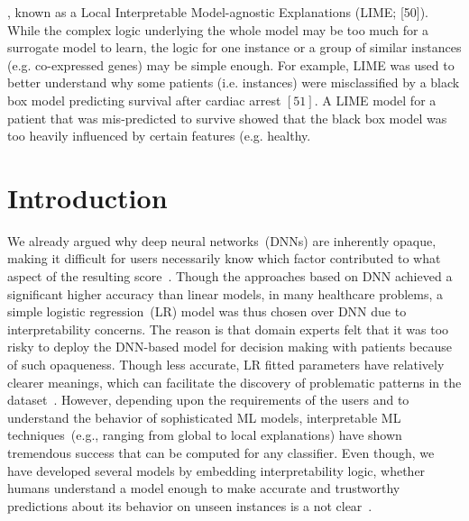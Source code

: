 , known as a Local Interpretable Model-agnostic Explanations (LIME; [50]). 
While the complex logic underlying the whole model may be too much for a surrogate model to learn, the logic for one instance or a group of similar instances (e.g. co-expressed genes) may be simple enough. For example, LIME was used to better understand why some patients (i.e. instances) were misclassified by a black box model predicting survival after cardiac arrest $[51] .$ A LIME model for a patient that was mis-predicted to survive showed that the black box model was too heavily influenced by certain features (e.g. healthy. 

\section{Introduction} \label{chapter_7:intro}
We already argued why deep neural networks~(DNNs) are inherently opaque, making it difficult for users necessarily know which factor contributed to what aspect of the resulting score~\cite{ribeiro2018anchors}. Though the approaches based on DNN achieved a significant higher accuracy than linear models, in many healthcare problems, a simple logistic regression~(LR) model was thus chosen over DNN due to interpretability concerns. The reason is that domain experts felt that it was too risky to deploy the DNN-based model for decision making with patients because of such opaqueness. Though less accurate, LR fitted parameters have relatively clearer meanings, which can facilitate the discovery of problematic patterns in the dataset~\cite{ming2018rulematrix}. 
However, depending upon the requirements of the users and to understand the behavior of sophisticated ML models, interpretable ML techniques~(e.g., ranging from global to local explanations) have shown tremendous success that can be computed for any classifier. Even though, we have developed several models by embedding interpretability logic, whether humans understand a model enough to make accurate and trustworthy predictions about its behavior on unseen instances is a not clear~\cite{ribeiro2018anchors}. 

